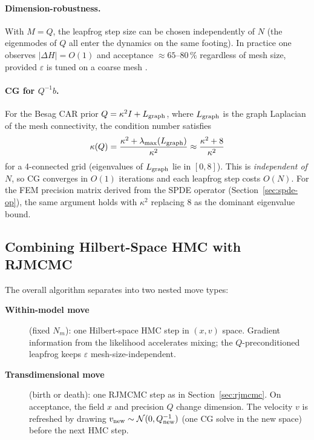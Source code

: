 \documentclass[11pt]{article}
\begin{document}
\paragraph{Dimension-robustness.}
With $M = Q$, the leapfrog step size can be chosen independently of $N$ (the
eigenmodes of $Q$ all enter the dynamics on the same footing).  In practice
one observes $|\Delta H| = O(1)$ and acceptance $\approx 65$--$80\,\%$ regardless
of mesh size, provided $\varepsilon$ is tuned on a coarse mesh \citep{beskos2011,
hairer2014}.

\paragraph{CG for $Q^{-1}b$.}
\label{sec:cg}
For the Besag CAR prior $Q = \kappa^2 I + L_{\rm graph}$, where $L_{\rm graph}$
is the graph Laplacian of the mesh connectivity, the condition number satisfies
\begin{equation}
  \kappa(Q) = \frac{\kappa^2 + \lambda_{\max}(L_{\rm graph})}{\kappa^2}
            \approx \frac{\kappa^2 + 8}{\kappa^2}
\end{equation}
for a 4-connected grid (eigenvalues of $L_{\rm graph}$ lie in $[0,8]$).  This is
\emph{independent of $N$}, so CG converges in $O(1)$ iterations and each leapfrog
step costs $O(N)$.  For the FEM precision matrix derived from the SPDE operator
(Section~\ref{sec:spde-op}), the same argument holds with $\kappa^2$
replacing 8 as the dominant eigenvalue bound.

\subsection{Combining Hilbert-Space HMC with RJMCMC}
\label{sec:rjmcmc-hmc}

The overall algorithm separates into two nested move types:

\begin{description}
  \item[\textbf{Within-model move}] (fixed $N_m$): one Hilbert-space HMC step in
    $(x, v)$ space.  Gradient information from the likelihood accelerates mixing;
    the $Q$-preconditioned leapfrog keeps $\varepsilon$ mesh-size-independent.
  \item[\textbf{Transdimensional move}] (birth or death): one RJMCMC step as in
    Section~\ref{sec:rjmcmc}.  On acceptance, the field $x$ and precision $Q$
    change dimension.  The velocity $v$ is refreshed by drawing
    $v_{\rm new} \sim \mathcal{N}(0, Q_{\rm new}^{-1})$
    (one CG solve in the new space) before the next HMC step.
\end{description}
\end{document}
